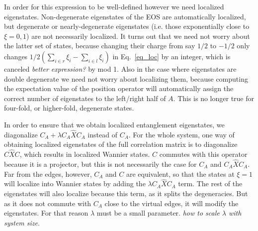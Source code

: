 \documentclass[twocolumn,amsmath,longbibliography,amssymb,superscriptaddress]{revtex4-1}
\newcommand{\carlos}[1]{{\color{red} #1}}
\newcommand{\mariac}[1]{{\it\color{cyan}#1}}
\begin{document}
In order for this expression to be well-defined however we need localized eigenstates. 
Non-degenerate eigenstates of the EOS are automatically localized, but degenerate or nearly-degenerate eigenstates (i.e. those exponentially close to $\xi=0,1$) are not necessarily localized. 
It turns out that we need not worry about the latter set of states, because changing their charge from say $1/2$ to $-1/2$ only changes $1/2(\sum_{i\in r} \xi_i - \sum_{i\in l}\xi_i)$ in Eq.~\eqref{eq_loc} by an integer, which is canceled \mariac{better expression?} by mod 1. 
Also in the case where eigenstates are double degenerate we need not worry about localizing them, because computing the expectation value of the position operator will automatically assign the correct number of eigenstates to the left/right half of $A$. 
This is no longer true for four-fold, or higher-fold, degenerate states.


In order to ensure that we obtain localized entanglement eigenstates,  we diagonalize $C_A + \lambda C_A\hat{X}C_A$ instead of $C_A$.
For the whole system, one way of obtaining localized eigenstates of the full correlation matrix is to diagonalize $C\hat{X}C$, which results in localized Wannier states. 
$C$ commutes with this operator because it is a projector, but this is not necessarily the case for $C_A$ and $C_A\hat{X}C_A$. 
Far from the edges, however, $C_A$ and $C$ are equivalent, so that the states at $\xi=1$ will localize into Wannier states by adding the $\lambda C_A\hat{X}C_A$ term.
The rest of the eigenstates will also localize because this term, as it splits the degeneracies. 
But as it does not commute with $C_A$ close to the virtual edges,  it will modify the eigenstates. 
For that reason $\lambda$ must be a small parameter. \mariac{how to scale $\lambda$ with system size}. 
\end{document}
